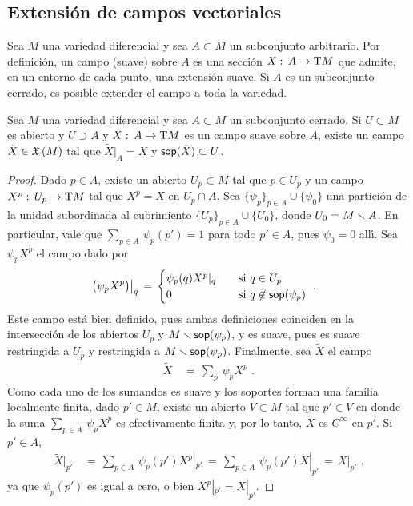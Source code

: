 \subsection{Extensi\'{o}n de campos vectoriales}
Sea $M$ una variedad diferencial y sea $A\subset M$ un subconjunto
arbitrario. Por definici\'{o}n, un campo (suave) sobre $A$ es una secci\'{o}n
$X:\,A\rightarrow\tangente{M}$ que admite, en un entorno de cada punto,
una extensi\'{o}n suave. Si $A$ es un subconjunto cerrado, es posible
extender el campo a toda la variedad.

\begin{propoExtenderUnCampo}\label{thm:extenderuncampo}
	Sea $M$ una variedad diferencial y sea $A\subset M$ un subconjunto
	cerrado. Si $U\subset M$ es abierto y $U\supset A$ y
	$X:\,A\rightarrow\tangente{M}$ es un campo suave sobre $A$, existe
	un campo $\tilde{X}\in\mathfrak{X}\left(M\right)$ tal que $\tilde{X}|_{A}=X$ y
	$\mathsf{sop}(\tilde{X})\subset U$.
\end{propoExtenderUnCampo}

\begin{proof}
	Dado $p\in A$, existe un abierto $U_{p}\subset M$ tal que
	$p\in U_{p}$ y un campo $X^{p}:\,U_{p}\rightarrow\tangente{M}$
	tal que $X^{p}=X$ en $U_{p}\cap A$. Sea
	$\{\psi_{p}\}_{p\in A}\cup\{\psi_{0}\}$ una partici\'{o}n de la unidad
	subordinada al cubrimiento $\{U_{p}\}_{p\in A}\cup\{U_{0}\}$, donde
	$U_{0}=M\smallsetminus A$. En particular, vale que
	$\sum_{p\in A}\,\psi_{p}(p')=1$ para todo $p'\in A$, pues $\psi_{0}=0$
	all\'{\i}. Sea $\psi_{p}X^{p}$ el campo dado por
	\begin{align*}
		\left.\big(\psi_{p}X^{p}\big)\right|_{q} & \,=\,
			\begin{cases}
				\psi_{p}(q)X^{p}|_{q} & \quad\text{si }
							q\in U_{p} \\
				0 & \quad\text{si }q\not\in\mathsf{sop}(\psi_{p})
			\end{cases}
		\text{ .}
	\end{align*}
	Este campo est\'{a} bien definido, pues ambas definiciones
	coinciden en la intersecci\'{o}n de los abiertos $U_{p}$ y
	$M\smallsetminus\mathsf{sop}(\psi_{p})$, y es suave, pues es suave
	restringida a $U_{p}$ y restringida a $M\smallsetminus\mathsf{sop}(\psi_{p})$.
	Finalmente, sea $\tilde{X}$ el campo
	\begin{align*}
		\tilde{X} & \,=\,\sum_{p}\,\psi_{p}X^{p}
		\text{ .}
	\end{align*}
	Como cada uno de los sumandos es suave y los soportes forman una
	familia localmente finita, dado $p'\in M$, existe un abierto
	$V\subset M$ tal que $p'\in V$ en donde la suma
	$\sum_{p\in A}\,\psi_{p}X^{p}$ es efectivamente finita y, por lo
	tanto, $\tilde{X}$ es $C^{\infty}$ en $p'$. Si $p'\in A$,
	\begin{align*}
		\tilde{X}|_{p'} & \,=\, \sum_{p\in A}\,\psi_{p}(p')X^{p}|_{p'}
			\,=\,\sum_{p\in A}\,\psi_{p}(p')X|_{p'}
			\,=\, X|_{p'}
		\text{ ,}
	\end{align*}
	ya que $\psi_{p}(p')$ es igual a cero, o bien $X^{p}|_{p'}=X|_{p'}$.
\end{proof}

